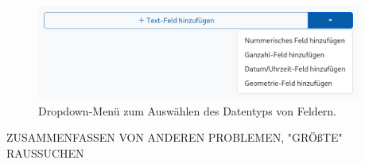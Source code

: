 \begin{frame}

  \begin{figure}
    \begin{center}
    \includegraphics[width=0.95\textwidth]{assets/datatype-dropdown.png}
    \end{center}
    \caption{Dropdown-Menü zum Auswählen des Datentyps von Feldern.}
  \end{figure}

\end{frame}

\begin{frame}

  ZUSAMMENFASSEN VON ANDEREN PROBLEMEN, "GRÖßTE" RAUSSUCHEN

\end{frame}
